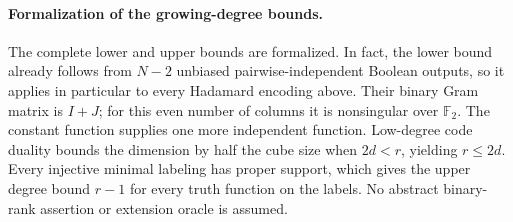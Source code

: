 \paragraph{Formalization of the growing-degree bounds.}
The complete lower and upper bounds are formalized. In fact, the lower
bound already follows from $N-2$ unbiased pairwise-independent Boolean
outputs, so it applies in particular to every Hadamard encoding above.
Their binary Gram matrix is $I+J$; for this even number of columns it
is nonsingular over $\mathbb F_2$. The constant function supplies one
more independent function. Low-degree code duality bounds the dimension
by half the cube size when $2d<r$, yielding $r\le2d$.
Every injective minimal labeling has proper support, which gives the
upper degree bound $r-1$ for every truth function on the labels.
No abstract binary-rank assertion or extension oracle is assumed.
